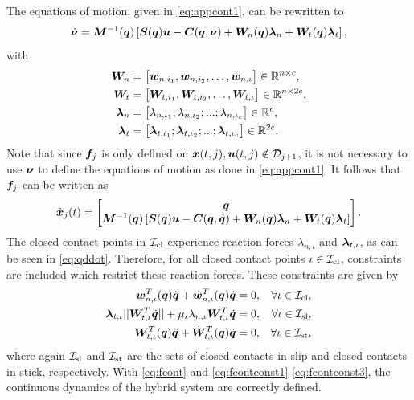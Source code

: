 \documentclass[../DC2017114Bouma.tex]{subfiles}
\begin{document}
The equations of motion, given in \eqref{eq:appcont1}, can be rewritten to
\begin{align}
\dot{\boldsymbol{\nu}} = {\boldsymbol{M}}^{-1}({\boldsymbol{q}})\left[ {\boldsymbol{S}}({\boldsymbol{q}}){\boldsymbol{u}} - {\boldsymbol{C}}({\boldsymbol{q}},\boldsymbol{\nu}) + {\boldsymbol{W}}_{n}({\boldsymbol{q}})\boldsymbol{\lambda}_{n} + {\boldsymbol{W}}_{t}({\boldsymbol{q}})\boldsymbol{\lambda}_{t}\right],\label{eq:qddot}
\end{align}
with
\begin{align*}
{\boldsymbol{W}}_n &= \begin{bmatrix}
{\boldsymbol{w}}_{n,i_1},{\boldsymbol{w}}_{n,i_2},\dots,{\boldsymbol{w}}_{n,\iota}
\end{bmatrix}\in\mathbb{R}^{n\times c},\\
{\boldsymbol{W}}_t &= \begin{bmatrix}
{\boldsymbol{W}}_{t,i_1},{\boldsymbol{W}}_{t,i_2},\dots,{\boldsymbol{W}}_{t,\iota} 
\end{bmatrix}\in\mathbb{R}^{n\times 2c},\\
\boldsymbol{\lambda}_n &= \begin{bmatrix}
\lambda_{n,\iota_1};\lambda_{n,\iota_2};...;\lambda_{n,\iota_c} 
\end{bmatrix}\in\mathbb{R}^{c},\\
\boldsymbol{\lambda}_t &= \begin{bmatrix}
\boldsymbol{\lambda}_{t,\iota_1};\boldsymbol{\lambda}_{t,\iota_2};...;\boldsymbol{\lambda}_{t,\iota_c} 
\end{bmatrix}\in\mathbb{R}^{2c}.
\end{align*}
Note that since ${\boldsymbol{f}}_j$ is only defined on ${\boldsymbol{x}}(t,j),{\boldsymbol{u}}(t,j)\notin \mathcal{D}_{j+1}$, it is not necessary to use $\boldsymbol{\nu}$ to define the equations of motion as done in \eqref{eq:appcont1}. It follows that ${\boldsymbol{f}}_j$ can be written as
\begin{align}
\dot{{\boldsymbol{x}}}_j(t) =\begin{bmatrix}
\dot{{\boldsymbol{q}}}\\ {\boldsymbol{M}}^{-1}({\boldsymbol{q}})\left[ {\boldsymbol{S}}({\boldsymbol{q}}){\boldsymbol{u}} - {\boldsymbol{C}}({\boldsymbol{q}},\dot{{\boldsymbol{q}}}) + {\boldsymbol{W}}_{n}({\boldsymbol{q}})\boldsymbol{\lambda}_{n} + {\boldsymbol{W}}_{t}({\boldsymbol{q}})\boldsymbol{\lambda}_{t}\right]
\end{bmatrix}.\label{eq:fcont}
\end{align}
The closed contact points in $\mathcal{I}_{\text{cl}}$ experience reaction forces $\lambda_{n,\iota}$ and $\boldsymbol{\lambda}_{t,\iota}$, as can be seen in \eqref{eq:qddot}. Therefore, for all closed contact points $\iota\in\mathcal{I}_{\text{cl}}$, constraints are included which restrict these reaction forces. These constraints are given by
\begin{align}
{\boldsymbol{w}}^T_{n,\iota}({\boldsymbol{q}})\ddot{{\boldsymbol{q}}} + \dot{{\boldsymbol{w}}}^T_{n,\iota}({\boldsymbol{q}})\dot{{\boldsymbol{q}}} &= 0, &\forall \iota\in\mathcal{I}_{\text{cl}},\label{eq:fcontconst1}\\
\boldsymbol{\lambda}_{t,\iota}||{\boldsymbol{W}}_{t,\iota}^T\dot{{\boldsymbol{q}}}|| + \mu_{\iota}\lambda_{n,\iota}{\boldsymbol{W}}_{t,\iota}^T\dot{{\boldsymbol{q}}} &= 0, &\forall \iota\in\mathcal{I}_{\text{sl}},\label{eq:fcontconst2}\\
{\boldsymbol{W}}^T_{t,\iota}({\boldsymbol{q}})\ddot{{\boldsymbol{q}}} + \dot{{\boldsymbol{W}}}^T_{t,\iota}({\boldsymbol{q}})\dot{{\boldsymbol{q}}} &= 0, &\forall \iota\in\mathcal{I}_{\text{st}},\label{eq:fcontconst3}
\end{align}
where again $\mathcal{I}_{\text{sl}}$ and $\mathcal{I}_{\text{st}}$ are the sets of closed contacts in slip and closed contacts in stick, respectively. With \eqref{eq:fcont} and \eqref{eq:fcontconst1}-\eqref{eq:fcontconst3}, the continuous dynamics of the hybrid system are correctly defined.
\end{document}
